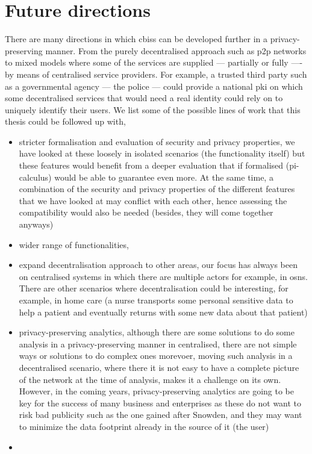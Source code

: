 \section{Future directions}
    \label{section:future-directions}
There are many directions in which \acp{cbis} can be developed further in a privacy-preserving 
manner. From the purely decentralised approach such as \ac{p2p} networks to mixed 
models where some of the services are supplied --- partially or fully ---- by means 
of centralised service providers. For example, a trusted third party such as a governmental 
agency --- the police --- could provide a national \ac{pki} on which some decentralised
services that would need a real identity could rely on to uniquely identify their 
users. We list some of the possible lines of work that this thesis could be followed 
up with,
\begin{itemize}
    
    \item stricter formalisation and evaluation of security and privacy properties,
    we have looked at these loosely in isolated scenarios (the functionality itself)
    but these features would benefit from a deeper evaluation that if formalised (pi-calculus) 
    would be able to guarantee even more.
    At the same time, a combination of the security and privacy properties of the 
    different features that we have looked at may conflict with each other, hence 
    assessing the compatibility would also be needed (besides, they will come together 
    anyways)
    
    \item wider range of functionalities,

    \item expand decentralisation approach to other areas,
    our focus has always been on centralised systems in which there are multiple actors
    for example, in osns. There are other scenarios where decentralisation could 
    be interesting, for example, in home care (a nurse transports some personal sensitive data
    to help a patient and eventually returns with some new data about that patient)
    
    \item privacy-preserving analytics,
    although there are some solutions to do some analysis in a privacy-preserving 
    manner in centralised, there are not simple ways or solutions to do complex ones
    morevoer, moving such analysis in a decentralised scenario, where there it is 
    not easy to have a complete picture of the network at the time of analysis, makes
    it a challenge on its own.
    However, in the coming years, privacy-preserving analytics are going to be key 
    for the success of many business and enterprises as these do not want to risk 
    bad publicity such as the one gained after Snowden, and they may want to minimize 
    the data footprint already in the source of it (the user)
    
    \item 

\end{itemize}

